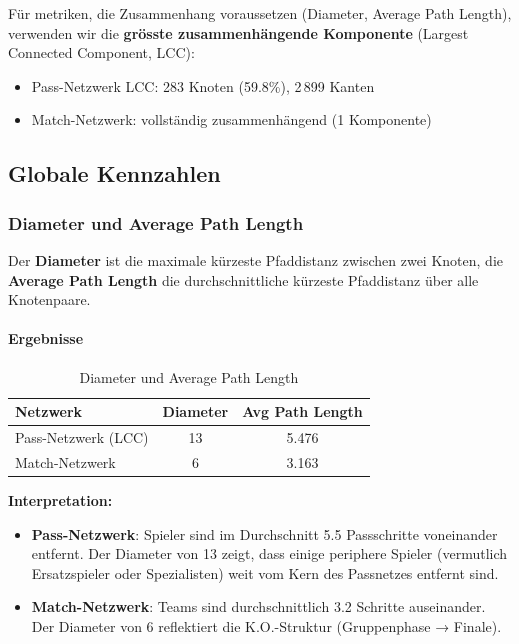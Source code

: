 Für metriken, die Zusammenhang voraussetzen (Diameter, Average Path Length), verwenden wir die \textbf{grösste zusammenhängende Komponente} (Largest Connected Component, LCC):
\begin{itemize}
  \item Pass-Netzwerk LCC: 283 Knoten (59.8\%), 2\,899 Kanten
  \item Match-Netzwerk: vollständig zusammenhängend (1 Komponente)
\end{itemize}

\subsection{Globale Kennzahlen}

\subsubsection{Diameter und Average Path Length}

Der \textbf{Diameter} ist die maximale kürzeste Pfaddistanz zwischen zwei Knoten, die \textbf{Average Path Length} die durchschnittliche kürzeste Pfaddistanz über alle Knotenpaare.

\paragraph{Ergebnisse}

\begin{table}[h]
\centering
\caption{Diameter und Average Path Length}
\label{tab:diameter_path_length}
\begin{tabular}{lcc}
\toprule
\textbf{Netzwerk} & \textbf{Diameter} & \textbf{Avg Path Length} \\
\midrule
Pass-Netzwerk (LCC) & 13 & 5.476 \\
Match-Netzwerk & 6 & 3.163 \\
\bottomrule
\end{tabular}
\end{table}

\textbf{Interpretation:}
\begin{itemize}
  \item \textbf{Pass-Netzwerk}: Spieler sind im Durchschnitt 5.5 Passschritte voneinander entfernt. Der Diameter von 13 zeigt, dass einige periphere Spieler (vermutlich Ersatzspieler oder Spezialisten) weit vom Kern des Passnetzes entfernt sind.
  \item \textbf{Match-Netzwerk}: Teams sind durchschnittlich 3.2 Schritte auseinander. Der Diameter von 6 reflektiert die K.O.-Struktur (Gruppenphase → Finale).
\end{itemize}

